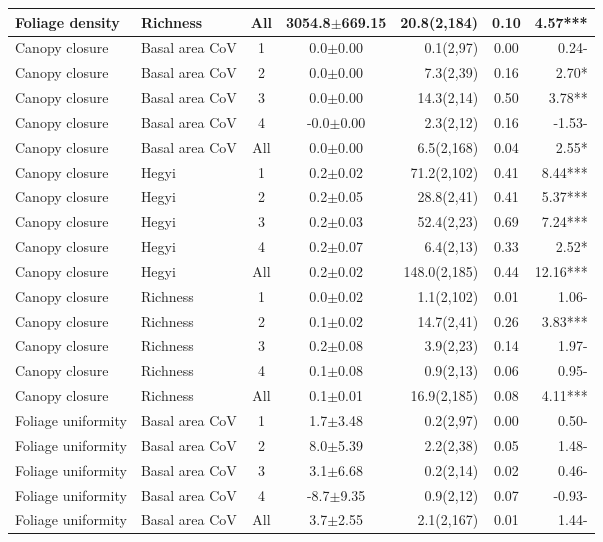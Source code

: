 \begin{longtable}{llcS[table-format=5.1(4.2)]rS[table-format=1.2]r}
  Foliage density & Richness & All & 3054.8$\pm$669.15 & 20.8(2,184) & 0.10 & 4.57*** \\ 
   \midrule
Canopy closure & Basal area CoV & 1 & 0.0$\pm$0.00 & 0.1(2,97) & 0.00 & 0.24- \\ 
  Canopy closure & Basal area CoV & 2 & 0.0$\pm$0.00 & 7.3(2,39) & 0.16 & 2.70* \\ 
  Canopy closure & Basal area CoV & 3 & 0.0$\pm$0.00 & 14.3(2,14) & 0.50 & 3.78** \\ 
  Canopy closure & Basal area CoV & 4 & -0.0$\pm$0.00 & 2.3(2,12) & 0.16 & -1.53- \\ 
  Canopy closure & Basal area CoV & All & 0.0$\pm$0.00 & 6.5(2,168) & 0.04 & 2.55* \\ 
   \midrule
Canopy closure & Hegyi & 1 & 0.2$\pm$0.02 & 71.2(2,102) & 0.41 & 8.44*** \\ 
  Canopy closure & Hegyi & 2 & 0.2$\pm$0.05 & 28.8(2,41) & 0.41 & 5.37*** \\ 
  Canopy closure & Hegyi & 3 & 0.2$\pm$0.03 & 52.4(2,23) & 0.69 & 7.24*** \\ 
  Canopy closure & Hegyi & 4 & 0.2$\pm$0.07 & 6.4(2,13) & 0.33 & 2.52* \\ 
  Canopy closure & Hegyi & All & 0.2$\pm$0.02 & 148.0(2,185) & 0.44 & 12.16*** \\ 
   \midrule
Canopy closure & Richness & 1 & 0.0$\pm$0.02 & 1.1(2,102) & 0.01 & 1.06- \\ 
  Canopy closure & Richness & 2 & 0.1$\pm$0.02 & 14.7(2,41) & 0.26 & 3.83*** \\ 
  Canopy closure & Richness & 3 & 0.2$\pm$0.08 & 3.9(2,23) & 0.14 & 1.97- \\ 
  Canopy closure & Richness & 4 & 0.1$\pm$0.08 & 0.9(2,13) & 0.06 & 0.95- \\ 
  Canopy closure & Richness & All & 0.1$\pm$0.01 & 16.9(2,185) & 0.08 & 4.11*** \\ 
   \midrule
Foliage uniformity & Basal area CoV & 1 & 1.7$\pm$3.48 & 0.2(2,97) & 0.00 & 0.50- \\ 
  Foliage uniformity & Basal area CoV & 2 & 8.0$\pm$5.39 & 2.2(2,38) & 0.05 & 1.48- \\ 
  Foliage uniformity & Basal area CoV & 3 & 3.1$\pm$6.68 & 0.2(2,14) & 0.02 & 0.46- \\ 
  Foliage uniformity & Basal area CoV & 4 & -8.7$\pm$9.35 & 0.9(2,12) & 0.07 & -0.93- \\ 
  Foliage uniformity & Basal area CoV & All & 3.7$\pm$2.55 & 2.1(2,167) & 0.01 & 1.44- \\ 

\end{longtable}
